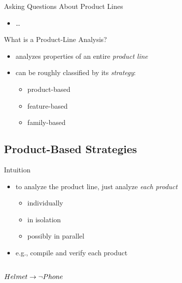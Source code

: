 \begin{frame}{\myframetitle}
\begin{mycolumns}[t,widths={47}]
\begin{example}{Asking Questions About Product Lines}
\begin{itemize}
				\item \ldots
			\end{itemize}
		\end{example}
		\begin{definition}{What is a Product-Line Analysis?}
			\begin{itemize}
				\item analyzes properties of an entire \emph{product line}
				\item can be roughly classified by its \emph{strategy}:
				\begin{itemize}
					\item product-based
					\item feature-based
					\item family-based
				\end{itemize}
			\end{itemize}
		\end{definition}
	\end{mycolumns}
\end{frame}

\subsection{Product-Based Strategies} %

\begin{frame}{\myframetitle}
	\begin{mycolumns}
		\begin{definition}{Intuition}
			\begin{itemize}
				\item to analyze the product line, just analyze \emph{each product}
				\begin{itemize}
					\item individually
					\item in isolation
					\item possibly in parallel
				\end{itemize}
				\item e.g., compile and verify each product
			\end{itemize}
		\end{definition}
		\begin{exampletight}{}
			\centering\featureDiagramLego\\$Helmet \rightarrow \neg Phone$
		\end{exampletight}
	\mynextcolumn
	\end{mycolumns}
\end{frame}

